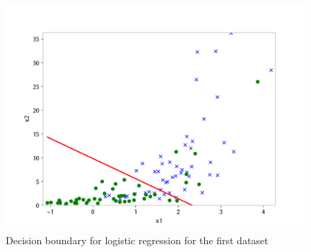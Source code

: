 \begin{answer}
    \begin{figure}[h]
        \centering
        \includegraphics*[width=.7\linewidth]{../src/linearclass/logreg_pred_1.pdf}
        \caption{Decision boundary for logistic regression for the first dataset}        
    \end{figure}
\end{answer}
